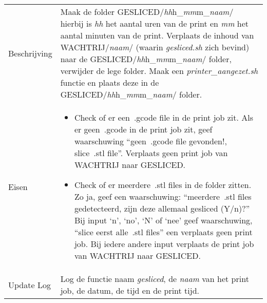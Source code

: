 \documentclass{article}
\newcommand{\quotes}[1]{``#1''}
\begin{document}
\begin{table}[H]
    \centering
    \begin{tabular}%
    {>{\raggedright\arraybackslash}p{}%
    |>{\raggedright\arraybackslash}p{}}
    \rowcolor{myblue} \multicolumn{2}{c}{\rule{0pt}{13pt}Functie: {\Large gesliced.sh}} \\\hline
    Beschrijving & Maak de folder GESLICED/\textit{hh}h\_\textit{mm}m\_\textit{naam}/ hierbij is \textit{hh} het aantal uren van de print en \textit{mm} het aantal minuten van de print. Verplaats de inhoud van WACHTRIJ/\textit{naam}/ (waarin \textit{gesliced.sh} zich bevind) naar de GESLICED/\textit{hh}h\_\textit{mm}m\_\textit{naam}/ folder, verwijder de lege folder. Maak een \textit{printer\_aangezet.sh} functie en plaats deze in de GESLICED/\textit{hh}h\_\textit{mm}m\_\textit{naam}/ folder.\\
    Eisen & 
    \begin{itemize} 
      \item Check of er een~.gcode file in de print job zit. Als er geen~.gcode in de print job zit, geef waarschuwing \quotes{geen~.gcode file gevonden!, slice~.stl file}. Verplaats geen print job van WACHTRIJ naar GESLICED.
\item Check of er meerdere~.stl files in de folder zitten. Zo ja, geef een waarschuwing: \quotes{meerdere~.stl files gedetecteerd, zijn deze allemaal gesliced (Y/n)?} Bij input `n', `no', `N' of `nee' geef waarschuwing, \quotes{slice eerst alle~.stl files} een verplaats geen print job. Bij iedere andere input verplaats de print job van WACHTRIJ naar GESLICED.  
\end{itemize} \\
    Update Log& Log de functie naam \textit{gesliced}, de \textit{naam} van het print job, de datum, de tijd en de print tijd.\\
    \end{tabular}
\end{table}
\end{document}
